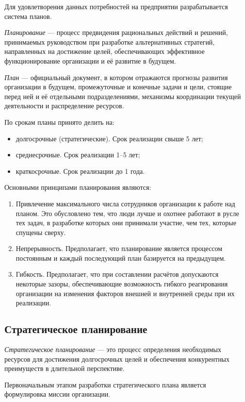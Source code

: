 \documentclass[12pt, russian, oneside, article]{ncc}
\begin{document}
Для удовлетворения данных потребностей на предприятии разрабатывается система планов.

\emph{Планирование} --- процесс предвидения рациональных действий и решений, принимаемых руководством при разработке альтернативных стратегий, направленных на достижение целей, обеспечивающих эффективное функционирование организации и её развитие в будущем.

\emph{План} --- официальный документ, в котором отражаются прогнозы развития организации в будущем, промежуточные и конечные задачи и цели, стоящие перед ней и её отдельными подразделениями, механизмы координации текущей деятельности и распределение ресурсов.

По срокам планы принято делить на:
\begin{itemize}
\item долгосрочные (стратегические). Срок реализации свыше 5 лет;
\item среднесрочные. Срок реализации 1--5 лет;
\item краткосрочные. Срок реализации до 1 года.
\end{itemize}

Основными принципами планирования являются:
\begin{enumerate}
\item Привлечение максимального числа сотрудников организации к работе над планом. Это обусловлено тем, что люди лучше и охотнее работают в русле тех задач, в разработке которых они принимали участие, чем тех, которые спущены сверху.
\item Непрерывность. Предполагает, что планирование является процессом постоянным и каждый последующий план базируется на предыдущем.
\item Гибкость. Предполагает, что при составлении расчётов допускаются некоторые зазоры, обеспечивающие возможность гибкого реагирования организации на изменения факторов внешней и внутренней среды при их реализации.
\end{enumerate}
\subsection{Стратегическое планирование}
\label{sec-2_2}


\emph{Стратегическое планирование} --- это процесс определения необходимых ресурсов для достижения долгосрочных целей и обеспечения конкурентных преимуществ в длительной перспективе.

Первоначальным этапом разработки стратегического плана является формулировка миссии организации.
\end{document}
